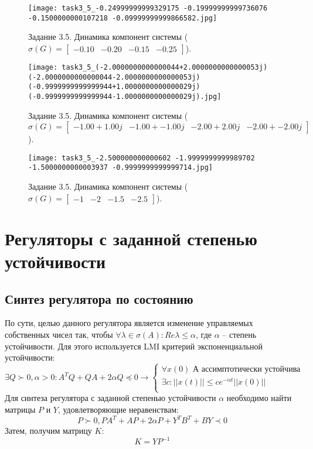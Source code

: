 \begin{figure}
    \centering
    \texttt{[image: task3\_5\_-0.24999999999329175 -0.19999999999736076 -0.1500000000107218 -0.09999999999866582.jpg]}
    \caption{Задание 3.5. Динамика компонент системы ($\sigma(G) = \begin{bmatrix} -0.10 & -0.20 & -0.15 & -0.25 \end{bmatrix}$).}
    \label{fig:task3_5_1.jpg}
\end{figure}
\begin{figure}
    \centering
    \texttt{[image: task3\_5\_(-2.0000000000000044+2.0000000000000053j) (-2.0000000000000044-2.0000000000000053j) (-0.9999999999999944+1.0000000000000029j) (-0.9999999999999944-1.0000000000000029j).jpg]}
    \caption{Задание 3.5. Динамика компонент системы ($\sigma(G) = \begin{bmatrix} -1.00 + 1.00j & -1.00 + -1.00j & -2.00 + 2.00j & -2.00 + -2.00j \end{bmatrix}$).}
    \label{fig:task3_5_2.jpg}
\end{figure}
\begin{figure}
    \centering
    \texttt{[image: task3\_5\_-2.500000000000602 -1.9999999999989702 -1.5000000000003937 -0.9999999999999714.jpg]}
    \caption{Задание 3.5. Динамика компонент системы ($\sigma(G) = \begin{bmatrix} -1 & -2 & -1.5 & -2.5 \end{bmatrix}$).}
    \label{fig:task3_5_3.jpg}
\end{figure}


\section{Регуляторы с заданной степенью устойчивости}

\subsection{Синтез регулятора по состоянию}
По сути, целью данного регулятора является изменение управляемых собственных чисел так, чтобы \(\forall \lambda \in \sigma(A): Re{\lambda} \leq \alpha\), где \(\alpha\) -- степень устойчивости.
Для этого используется LMI критерий экспоненциальной устойчивости:
\[ \exists Q \succ 0 , \alpha > 0 :  A^TQ + QA + 2 \alpha Q \preccurlyeq 0 \rightarrow
\begin{cases}
    \text{\(\forall x(0)\) А ассимптотически устойчива}\\
    \exists c :  ||x(t)|| \le  c e^{-\alpha t} ||x(0)|| \\
\end{cases}
\]
Для синтеза регулятора с заданной степенью устойчивости $\alpha$ необходимо найти матрицы $P$ и $Y$,
удовлетворяющие неравенствам:
\begin{equation}
    P \succ 0, PA^T + AP +2\alpha P + Y^TB^T + BY \prec 0
\end{equation}
Затем, получим матрицу $K$:
\begin{equation}
    K = YP^{-1}
\end{equation}

